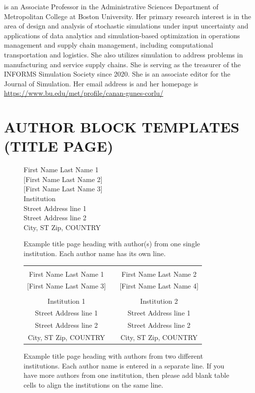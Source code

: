 \documentclass{wscpaperproc}
\theoremstyle{wsc}
\begin{document}
 is an Associate Professor in the Administrative Sciences Department of Metropolitan College at Boston University. Her primary research interest is in the area of design and analysis of stochastic simulations under input uncertainty and applications of data analytics and simulation-based optimization in operations management and supply chain management, including computational transportation and logistics. She also utilizes simulation to address problems in manufacturing and service supply chains. She is serving as the treasurer of the INFORMS Simulation Society since 2020. She is an associate editor for the Journal of Simulation. Her email address is  and her homepage is \url{https://www.bu.edu/met/profile/canan-gunes-corlu/}

\newpage

\section*{AUTHOR BLOCK TEMPLATES (TITLE PAGE)}

\begin{figure}[htb]
{
\centering
First Name Last Name 1 \\
$[$First Name Last Name 2$]$ \\
$[$First Name Last Name 3$]$ \\
\vspace{12pt}
Institution \\
Street Address line 1 \\
Street Address line 2 \\
City, ST Zip, COUNTRY
\caption{Example title page heading with author(s) from one single institution. Each author name has its own line. \label{fig: 2 same}}
}
\end{figure}

\begin{figure}[htb]
{
\centering
\begin{tabular}{ccc}
\phantom{Entries to adjust spacing - ignore} & \phantom{intermediate space} & \phantom{Entries to adjust spacing - ignore} \\
First Name Last Name 1 & & First Name Last Name 2 \\
$[$First Name Last Name 3$]$ & & $[$First Name Last Name 4$]$ \\
\\
Institution 1 & & Institution 2 \\
Street Address line 1 & & Street Address line 1 \\
Street Address line 2 & & Street Address line 2 \\
City, ST Zip, COUNTRY & & City, ST Zip, COUNTRY
\end{tabular}
\caption{Example title page heading with authors from two different institutions. Each author name is entered in a separate line. If you have more authors from one institution, then please add blank table cells to align the institutions on the same line. \label{fig: 2 different}}
}
\end{figure}
\end{document}

